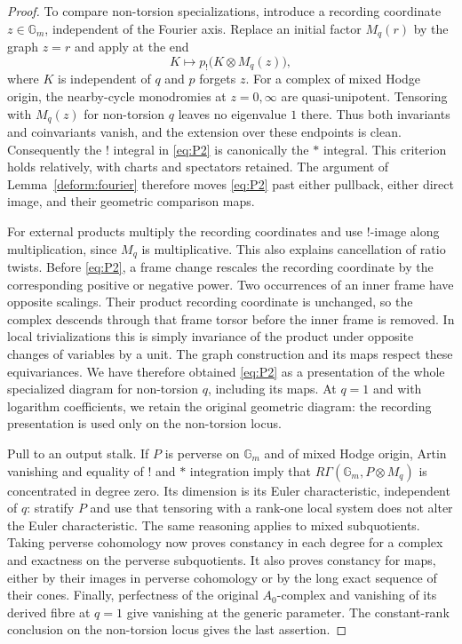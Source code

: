 \documentclass[11pt]{article}
\numberwithin{equation}{section}
\theoremstyle{definition}
\theoremstyle{remark}
\begin{document}
\begin{proof}
To compare non-torsion specializations, introduce a recording coordinate
$z\in\mathbb G_m$, independent of the Fourier axis.  Replace an
initial factor $M_q(r)$ by the graph
$z=r$ and apply at the end
\begin{equation}\label{eq:P2}
                K\longmapsto p_!\bigl(K\otimes M_q(z)\bigr),
\end{equation}
where $K$ is independent of $q$ and $p$ forgets $z$.
For a complex of mixed Hodge origin, the nearby-cycle monodromies
at $z=0,\infty$ are quasi-unipotent.  Tensoring with $M_q(z)$ for
non-torsion $q$ leaves no eigenvalue $1$ there.  Thus both invariants
and coinvariants vanish, and the extension over these endpoints is
clean.  Consequently the $!$ integral in \eqref{eq:P2} is canonically
the $*$ integral.  This criterion holds relatively, with charts and
spectators retained.  The argument of Lemma~\ref{deform:fourier}
therefore moves \eqref{eq:P2} past either pullback, either direct
image, and their geometric comparison maps.

For external products multiply the recording coordinates and use
$!$-image along multiplication, since $M_q$ is multiplicative.  This
also explains cancellation of ratio twists.  Before
\eqref{eq:P2}, a frame change rescales the recording coordinate by
the corresponding positive or negative power.  Two occurrences of
an inner frame have opposite scalings.  Their product recording
coordinate is unchanged, so the complex descends through that
frame torsor before the inner frame is removed.  In local
trivializations this is simply invariance of the product under
opposite changes of variables by a unit.  The graph construction
and its maps respect these equivariances.  We have therefore obtained
\eqref{eq:P2} as a presentation of the whole specialized diagram for
non-torsion $q$, including its maps.  At $q=1$ and with logarithm
coefficients, we retain the original geometric diagram: the recording
presentation is used only on the non-torsion locus.

Pull to an output stalk.  If $P$ is perverse on $\mathbb G_m$ and
of mixed Hodge origin, Artin vanishing and equality of $!$ and $*$
integration imply that
$R\Gamma(\mathbb G_m,P\otimes M_q)$ is concentrated in degree zero.
Its dimension is its Euler characteristic, independent of $q$:
stratify $P$ and use that tensoring with a rank-one local system
does not alter the Euler characteristic.  The same reasoning
applies to mixed subquotients.  Taking perverse cohomology now
proves constancy in each degree for a complex and exactness on the
perverse subquotients.  It also proves constancy for maps, either
by their images in perverse cohomology or by the long exact
sequence of their cones.  Finally, perfectness of the original
$A_0$-complex and vanishing of its derived fibre at $q=1$ give
vanishing at the generic parameter.
The constant-rank conclusion on the non-torsion locus gives the
last assertion.
\end{proof}
\end{document}

